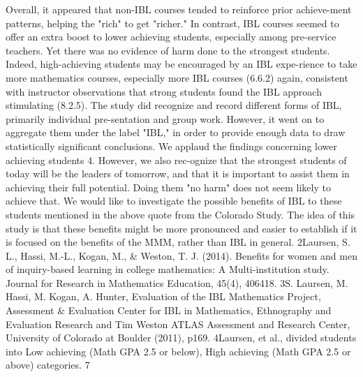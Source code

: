 \documentclass[11pt]{article}
\begin{document}
Overall, it appeared that non-IBL courses tended to reinforce prior achieve-ment patterns, helping the "rich" to get "richer." In contrast, IBL courses seemed to offer an extra boost to lower achieving students, especially among pre-service teachers. Yet there was no evidence of harm done to the strongest students. Indeed, high-achieving students may be encouraged by an IBL expe-rience to take more mathematics courses, especially more IBL courses (6.6.2) again, consistent with instructor observations that strong students found the IBL approach stimulating (8.2.5). The study did recognize and record different forms of IBL, primarily individual pre-sentation and group work. However, it went on to aggregate them under the label "IBL," in order to provide enough data to draw statistically significant conclusions. We applaud the findings concerning lower achieving students 4. However, we also rec-ognize that the strongest students of today will be the leaders of tomorrow, and that it is important to assist them in achieving their full potential. Doing them "no harm" does not seem likely to achieve that. We would like to investigate the possible benefits of IBL to these students mentioned in the above quote from the Colorado Study. The idea of this study is that these benefits might be more pronounced and easier to establish if it is focused on the benefits of the MMM, rather than IBL in general.
2Laursen, S. L., Hassi, M.-L., Kogan, M., \& Weston, T. J. (2014). Benefits for women and men of inquiry-based learning in college mathematics: A Multi-institution study. Journal for Research in Mathematics Education, 45(4), 406418.
3S. Laursen, M. Hassi, M. Kogan, A. Hunter, Evaluation of the IBL Mathematics Project, Assessment \& Evaluation Center for IBL in Mathematics, Ethnography and Evaluation Research and Tim Weston ATLAS Assessment and Research Center, University of Colorado at Boulder (2011), p169.
4Laursen, et al., divided students into Low achieving (Math GPA 2.5 or below), High achieving (Math GPA 2.5 or above) categories. 7
\end{document}
